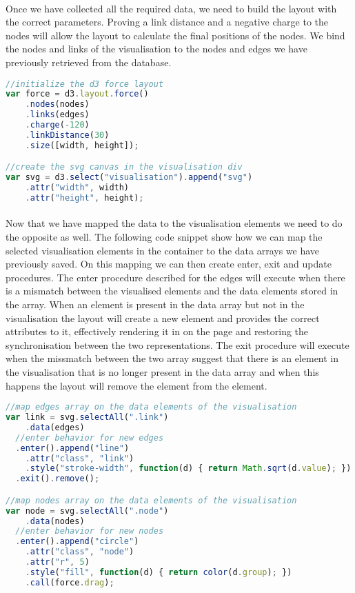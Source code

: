 	\paragraph{}
	Once we have collected all the required data, we need to build the layout with the correct parameters. Proving a link distance and a negative charge to the nodes will allow the layout to calculate the final positions of the nodes. We bind the nodes and links of the visualisation to the nodes and edges we have previously retrieved from the database.
	\begin{lstlisting}[language=JavaScript]
//initialize the d3 force layout
var force = d3.layout.force()
	.nodes(nodes)
	.links(edges)
	.charge(-120)
	.linkDistance(30)
	.size([width, height]);

//create the svg canvas in the visualisation div
var svg = d3.select("visualisation").append("svg")
	.attr("width", width)
	.attr("height", height);

	\end{lstlisting}
	\paragraph{}
	Now that we have mapped the data to the visualisation elements we need to do the opposite as well. The following code snippet show how we can map the selected visualisation elements in the  container to the data arrays we have previously saved. On this mapping we can then create enter, exit and update procedures. The enter procedure described for the edges will execute when there is a mismatch between the visualised elements and the data elements stored in the  array. When an element is present in the data array but not in the visualisation the layout will  create a new  element and provides the correct attributes to it, effectively rendering it in on the page and restoring the synchronisation between the two representations. The exit procedure will execute when the missmatch between the two array suggest that there is an element in the visualisation that is no longer present in the data array and when this happens the layout will remove the element from the  element.
	\begin{lstlisting}[language=JavaScript]
//map edges array on the data elements of the visualisation
var link = svg.selectAll(".link")
    .data(edges)
  //enter behavior for new edges
  .enter().append("line")
    .attr("class", "link")
    .style("stroke-width", function(d) { return Math.sqrt(d.value); })
  .exit().remove();

//map nodes array on the data elements of the visualisation
var node = svg.selectAll(".node")
    .data(nodes)
  //enter behavior for new nodes
  .enter().append("circle")
    .attr("class", "node")
    .attr("r", 5)
    .style("fill", function(d) { return color(d.group); })
    .call(force.drag);

	\end{lstlisting}
